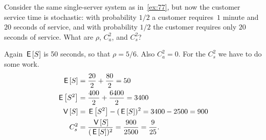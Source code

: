 \documentclass[stochastic-or.tex]{subfiles}
\begin{document}
\begin{exercise}\label{ex:76}
 Consider the same single-server system as in~\cref{ex:77}, but now the customer service time is stochastic: with probability $1/2$ a customer requires~$1$ minute and $20$ seconds of service, and with probability $1/2$ the customer requires only $20$ seconds of service.
 What are $\rho$, $C_a^2$, and $C_s^2$?
\begin{solution}
 Again $\,\mathsf{E}\left[S\right]$ is 50 seconds, so that $\rho = 5/6$. Also
 $C_a^2=0$. For the $C_s^2$ we have to do some work.
 \begin{equation*}
 \begin{split}
 \,\mathsf{E}\left[S\right] &= \frac{20}2 + \frac{80}2 = 50 \\
 \,\mathsf{E}\left[S^2\right] &= \frac{400}2 + \frac{6400} 2 = 3400 \\
 \,\mathsf{V}\left[S\right] &= \,\mathsf{E}\left[S^2\right] - (\,\mathsf{E}\left[S\right])^2 = 3400 - 2500 = 900 \\
 C_s^2 &= \frac{\,\mathsf{V}\left[S\right]}{(\,\mathsf{E}\left[S\right])^2} = \frac{900}{2500}=\frac{9}{25}.
 \end{split}
 \end{equation*}
\end{solution}
\end{exercise}
\end{document}
